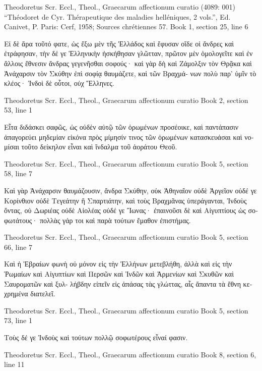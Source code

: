 \documentclass[12pt,letterpaper,twoside,final]{memoir}
\begin{document}
\begin{greek}

Theodoretus Scr. Eccl., Theol., Graecarum affectionum curatio (4089: 001)
“Théodoret de Cyr. Thérapeutique des maladies helléniques, 2 vols.”, Ed. Canivet, P.
Paris: Cerf, 1958; Sources chrétiennes 57.
Book 1, section 25, line 6

Εἰ δὲ ἄρα τοῦτό φατε, ὡς ἔξω μὲν τῆς Ἑλλάδος καὶ ἔφυσαν 
οἵδε οἱ ἄνδρες καὶ ἐτράφησαν, τὴν δέ γε Ἑλληνικὴν ἠσκήθησαν 
γλῶτταν, πρῶτον μὲν ὁμολογεῖτε καὶ ἐν ἄλλοις ἔθνεσιν ἄνδρας 
γεγενῆσθαι σοφούς· καὶ γὰρ δὴ καὶ Ζάμολξιν τὸν Θρᾷκα καὶ 
Ἀνάχαρσιν τὸν Σκύθην ἐπὶ σοφίᾳ θαυμάζετε, καὶ τῶν Βραχμά-
νων πολὺ παρ' ὑμῖν τὸ κλέος· Ἰνδοὶ δὲ οὗτοι, οὐχ Ἕλληνες. 



Theodoretus Scr. Eccl., Theol., Graecarum affectionum curatio 
Book 2, section 53, line 1

          Εἶτα διδάσκει σαφῶς, ὡς οὐδὲν αὐτῷ τῶν ὁρωμένων 
προσέοικε, καὶ παντάπασιν ἀπαγορεύει μηδεμίαν εἰκόνα πρὸς 
μίμησίν τινος τῶν ὁρωμένων κατασκευάσαι καὶ νομίσαι τοῦτο 
δείκηλον εἶναι καὶ ἴνδαλμα τοῦ ἀοράτου Θεοῦ. 



Theodoretus Scr. Eccl., Theol., Graecarum affectionum curatio 
Book 5, section 58, line 7

                                                 Καὶ γὰρ Ἀνάχαρσιν 
θαυμάζουσιν, ἄνδρα Σκύθην, οὐκ Ἀθηναῖον οὐδὲ Ἀργεῖον οὐδέ 
γε Κορίνθιον οὐδὲ Τεγεάτην ἢ Σπαρτιάτην, καὶ τοὺς Βραχμᾶνας 
ὑπεράγανται, Ἰνδοὺς ὄντας, οὐ Δωριέας οὐδὲ Αἰολέας οὐδέ γε 
Ἴωνας· ἐπαινοῦσι δὲ καὶ Αἰγυπτίους ὡς σοφωτάτους· πολλὰς 
γάρ τοι καὶ παρὰ τούτων ἔμαθον ἐπιστήμας. 



Theodoretus Scr. Eccl., Theol., Graecarum affectionum curatio 
Book 5, section 66, line 7

Καὶ ἡ Ἑβραίων φωνὴ οὐ μόνον εἰς τὴν Ἑλλήνων μετεβλήθη, 
ἀλλὰ καὶ εἰς τὴν Ῥωμαίων καὶ Αἰγυπτίων καὶ Περσῶν καὶ 
Ἰνδῶν καὶ Ἀρμενίων καὶ Σκυθῶν καὶ Σαυροματῶν καὶ ξυλ-
λήβδην εἰπεῖν εἰς ἁπάσας τὰς γλώττας, αἷς ἅπαντα τὰ ἔθνη 
κεχρημένα διατελεῖ. 



Theodoretus Scr. Eccl., Theol., Graecarum affectionum curatio 
Book 5, section 73, line 1

             Τοὺς δέ γε Ἰνδοὺς καὶ τούτων πολλῷ σοφωτέρους 
εἶναί φασιν. 




Theodoretus Scr. Eccl., Theol., Graecarum affectionum curatio 
Book 8, section 6, line 11


\end{greek}
\end{document}
